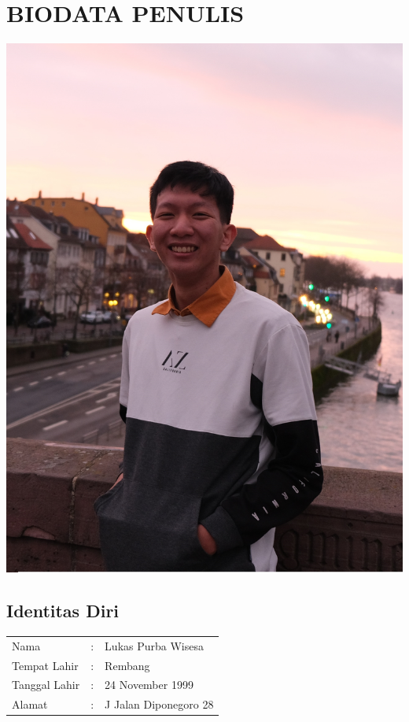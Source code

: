 \chapter*{BIODATA PENULIS}
	\begin{center}
		\includegraphics[height=0.2\textheight]{./ubah/Foto}
	\end{center}
\section*{Identitas Diri}
\begin{tabular}{p{3cm}cp{9cm}}
	Nama  		  & :&
		Lukas Purba Wisesa \\
	Tempat Lahir  & :&
		Rembang\\
	Tanggal Lahir &:& 
		24 November 1999\\
	Alamat        &:& J
		Jalan Diponegoro 28\\
\end{tabular}

